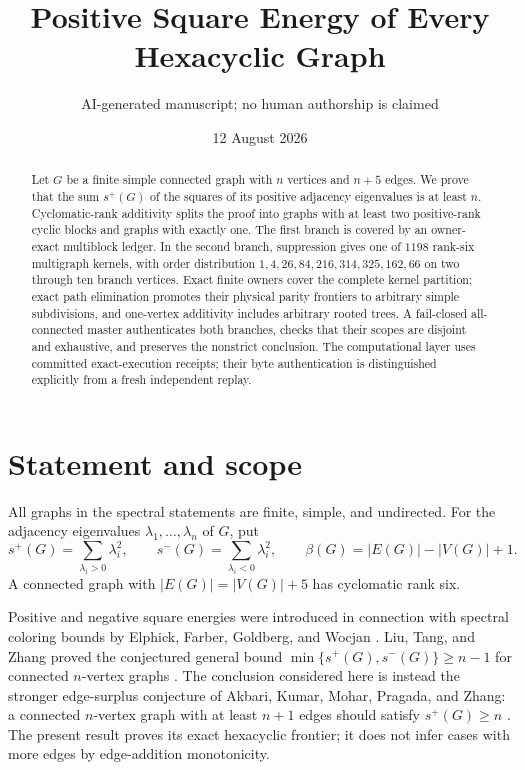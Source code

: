 \documentclass[11pt]{article}
\title{Positive Square Energy of Every Hexacyclic Graph}
\author{AI-generated manuscript; no human authorship is claimed}
\date{12 August 2026}
\theoremstyle{definition}
\theoremstyle{remark}
\newcommand{\spn}{s^+}
\newcommand{\smn}{s^-}
\newcommand{\betarank}{\beta}
\begin{document}
\maketitle

\begin{abstract}
Let $G$ be a finite simple connected graph with $n$ vertices and $n+5$ edges.
We prove that the sum $\spn(G)$ of the squares of its positive adjacency
eigenvalues is at least $n$.  Cyclomatic-rank additivity splits the proof into
graphs with at least two positive-rank cyclic blocks and graphs with exactly
one.  The first branch is covered by an owner-exact multiblock ledger.  In the
second branch, suppression gives one of $1198$ rank-six multigraph kernels,
with order distribution $1,4,26,84,216,314,325,162,66$ on two through ten
branch vertices.  Exact finite owners cover the complete kernel partition;
exact path elimination promotes their physical parity frontiers to arbitrary
simple subdivisions, and one-vertex additivity includes arbitrary rooted
trees.  A fail-closed all-connected master authenticates both branches, checks
that their scopes are disjoint and exhaustive, and preserves the nonstrict
conclusion.  The computational layer uses committed exact-execution receipts;
their byte authentication is distinguished explicitly from a fresh independent
replay.
\end{abstract}

\section{Statement and scope}

All graphs in the spectral statements are finite, simple, and undirected.  For
the adjacency eigenvalues $\lambda_1,\ldots,\lambda_n$ of $G$, put
\[
 \spn(G)=\sum_{\lambda_i>0}\lambda_i^2,
 \qquad
 \smn(G)=\sum_{\lambda_i<0}\lambda_i^2,
 \qquad
 \betarank(G)=|E(G)|-|V(G)|+1.
\]
A connected graph with $|E(G)|=|V(G)|+5$ has cyclomatic rank six.

Positive and negative square energies were introduced in connection with
spectral coloring bounds by Elphick, Farber, Goldberg, and Wocjan
\cite{EFGW}.  Liu, Tang, and Zhang proved the conjectured general bound
$\min\{\spn(G),\smn(G)\}\ge n-1$ for connected $n$-vertex graphs
\cite{LTZ}.  The conclusion considered here is instead the stronger
edge-surplus conjecture of Akbari, Kumar, Mohar, Pragada, and Zhang: a connected
$n$-vertex graph with at least $n+1$ edges should satisfy $\spn(G)\ge n$
\cite[Conjecture~1.2]{AKMPZ}.  The present result proves its exact hexacyclic
frontier; it does not infer cases with more edges by edge-addition monotonicity.
\end{document}
